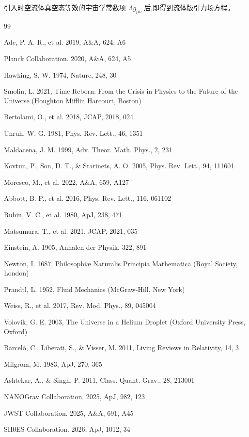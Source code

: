 \documentclass[11pt,a4paper]{article}
\newcommand{\aap}{A\&A}
\newcommand{\prl}{Phys. Rev. Lett.}
\newcommand{\apj}{ApJ}
\begin{document}
引入时空流体真空态等效的宇宙学常数项 $\Lambda g_{\mu\nu}$ 后,即得到流体版引力场方程。

\begin{thebibliography}{99}

 Ade, P. A. R., et al. 2019, \aap, 624, A6

 Planck Collaboration. 2020, \aap, 624, A5

 Hawking, S. W. 1974, Nature, 248, 30

 Smolin, L. 2021, Time Reborn: From the Crisis in Physics to the Future of the Universe (Houghton Mifflin Harcourt, Boston)

 Bertolami, O., et al. 2018, JCAP, 2018, 024

 Unruh, W. G. 1981, \prl, 46, 1351

 Maldacena, J. M. 1999, Adv. Theor. Math. Phys., 2, 231

 Kovtun, P., Son, D. T., \& Starinets, A. O. 2005, \prl, 94, 111601

 Moresco, M., et al. 2022, \aap, 659, A127

 Abbott, B. P., et al. 2016, \prl, 116, 061102

 Rubin, V. C., et al. 1980, \apj, 238, 471

 Matsumura, T., et al. 2021, JCAP, 2021, 035

 Einstein, A. 1905, Annalen der Physik, 322, 891

 Newton, I. 1687, Philosophiæ Naturalis Principia Mathematica (Royal Society, London)

 Prandtl, L. 1952, Fluid Mechanics (McGraw-Hill, New York)

 Weiss, R., et al. 2017, Rev. Mod. Phys., 89, 045004

 Volovik, G. E. 2003, The Universe in a Helium Droplet (Oxford University Press, Oxford)

 Barceló, C., Liberati, S., \& Visser, M. 2011, Living Reviews in Relativity, 14, 3

 Milgrom, M. 1983, \apj, 270, 365

 Ashtekar, A., \& Singh, P. 2011, Class. Quant. Grav., 28, 213001

 NANOGrav Collaboration. 2025, \apj, 982, 123

 JWST Collaboration. 2025, \aap, 691, A45

 SH0ES Collaboration. 2026, \apj, 1012, 34

\end{thebibliography}
\end{document}
